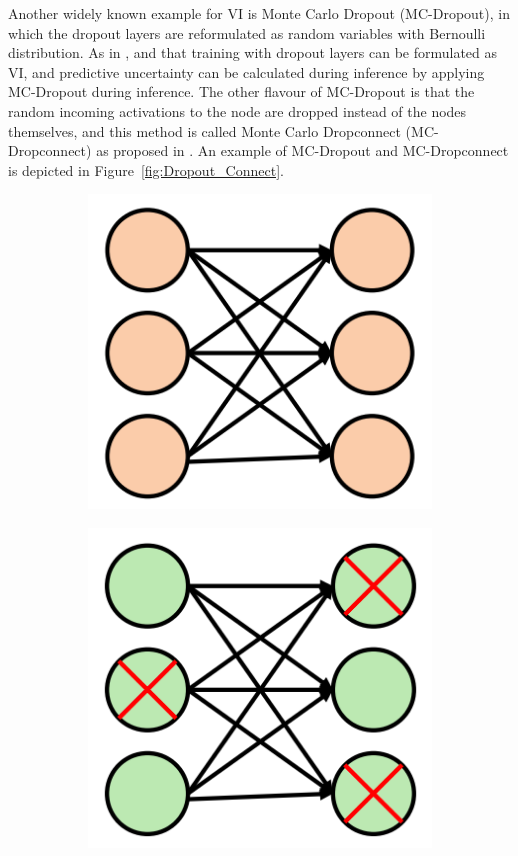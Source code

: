     Another widely known example for VI is Monte Carlo Dropout (MC-Dropout), in which the dropout layers are reformulated as random variables with Bernoulli distribution.
    As in \cite{bhandary2020evaluating}, and \cite{gawlikowski2021survey} that training with dropout layers can be formulated as VI, and predictive uncertainty can be calculated during inference by applying MC-Dropout during inference.
    The other flavour of MC-Dropout is that the random incoming activations to the node are dropped instead of the nodes themselves, and this method is called Monte Carlo Dropconnect (MC-Dropconnect) as proposed in \cite{gawlikowski2021survey}.
    An example of MC-Dropout and MC-Dropconnect is depicted in Figure~\ref{fig:Dropout_Connect}.
    \begin{figure}[htbp]
        \begin{subfigure}{0.33\textwidth}
            \centering
            \includegraphics[scale=0.33]{images/BaseNW_SOTA.png}
            \caption{}
        \end{subfigure}
        \begin{subfigure}{0.33\textwidth}
            \centering
            \includegraphics[scale=0.33]{images/Dropout_SOTA.png}

\end{subfigure}
\end{figure}

